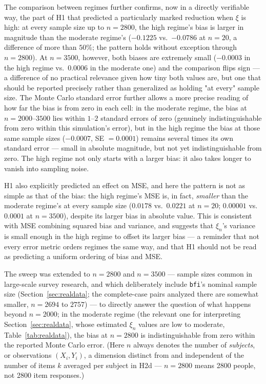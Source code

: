 \documentclass[article]{ajs}
\begin{document}
The comparison between regimes further confirms, now in a directly
verifiable way, the part of H1 that predicted a particularly marked
reduction when $\xi$ is high: at every sample size up to $n=2800$, the
high regime's bias is larger in magnitude than the moderate regime's
($-0.1225$ vs.\ $-0.0786$ at $n=20$, a difference of more than $50\%$;
the pattern holds without exception through $n=2800$). At $n=3500$,
however, both biases are extremely small ($-0.0003$ in the high regime
vs.\ $0.0006$ in the moderate one) and the comparison flips sign --- a
difference of no practical relevance given how tiny both values are,
but one that should be reported precisely rather than generalized as
holding "at every" sample size. The Monte Carlo standard error further
allows a more precise reading of how far the bias is from zero in each
cell: in the moderate regime, the bias at $n=2000$--$3500$ lies within
$1$--$2$ standard errors of zero (genuinely indistinguishable from
zero within this simulation's error), but in the high regime the bias
at those same sample sizes ($-0.0007$, SE $= 0.0001$) remains several
times its own standard error --- small in absolute magnitude, but not
yet indistinguishable from zero. The high regime not only starts with
a larger bias: it also takes longer to vanish into sampling noise.

H1 also explicitly predicted an effect on MSE, and here the pattern is
not as simple as that of the bias: the high regime's MSE is, in fact,
\emph{smaller} than the moderate regime's at every sample size
($0.0178$ vs.\ $0.0221$ at $n=20$; $0.00001$ vs.\ $0.0001$ at $n=3500$),
despite its larger bias in absolute value. This is consistent with MSE
combining squared bias and variance, and suggests that $\xi_n$'s
variance is small enough in the high regime to offset its larger
bias --- a reminder that not every error metric orders regimes the
same way, and that H1 should not be read as predicting a uniform
ordering of bias and MSE.

The sweep was extended to $n=2800$ and $n=3500$ --- sample sizes common
in large-scale survey research, and which deliberately include
\texttt{bfi}'s nominal sample size (Section~\ref{sec:realdata}; the
complete-case pairs analyzed there are somewhat smaller, $n=2694$ to
$2757$) --- to
directly answer the question of what happens beyond $n=2000$; in the
moderate regime (the relevant one for interpreting
Section~\ref{sec:realdata}, whose estimated $\xi_n$ values are low to
moderate, Table~\ref{tab:realdata}), the bias at $n=2800$ is
indistinguishable from zero within the reported Monte Carlo error.
(Here $n$ always denotes the number of \emph{subjects}, or
observations $(X_i,Y_i)$, a dimension distinct from and independent of
the number of items $k$ averaged per subject in H2d --- $n=2800$ means
2800 people, not 2800 item responses.)
\end{document}
